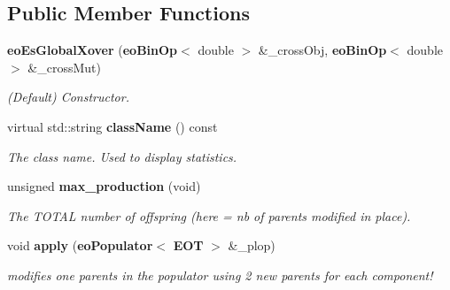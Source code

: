 \subsection*{Public Member Functions}
\begin{CompactItemize}
\item 
{\bf eo\-Es\-Global\-Xover} ({\bf eo\-Bin\-Op}$<$ double $>$ \&\_\-cross\-Obj, {\bf eo\-Bin\-Op}$<$ double $>$ \&\_\-cross\-Mut)\label{classeo_es_global_xover_a0}

\begin{CompactList}\small\item\em (Default) Constructor. \item\end{CompactList}\item 
virtual std::string {\bf class\-Name} () const \label{classeo_es_global_xover_a1}

\begin{CompactList}\small\item\em The class name. Used to display statistics. \item\end{CompactList}\item 
unsigned {\bf max\_\-production} (void)\label{classeo_es_global_xover_a2}

\begin{CompactList}\small\item\em The TOTAL number of offspring (here = nb of parents modified in place). \item\end{CompactList}\item 
void {\bf apply} ({\bf eo\-Populator}$<$ {\bf EOT} $>$ \&\_\-plop)
\begin{CompactList}\small\item\em modifies one parents in the populator using 2 new parents for each component! \item\end{CompactList}\end{CompactItemize}
